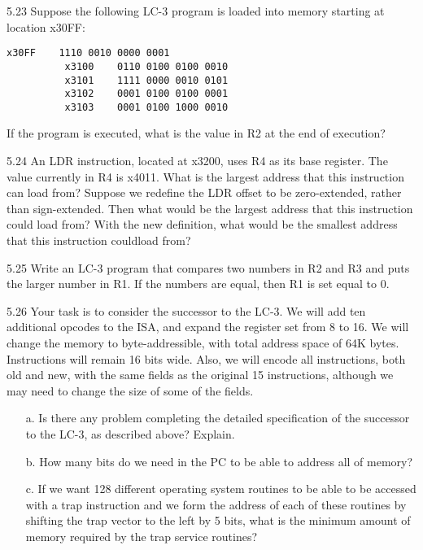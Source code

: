 \documentclass{patt}
\begin{document}
\begin{exercises}
\enlargethispage{-\baselineskip}

\pagebreak

\item[5.23] Suppose the following LC-3 program is loaded into memory
  starting at location x30FF:
\color{seventyblack}
\begin{Verbatim}[fontsize=\fontsize{9}{14}\selectfont]
          x30FF    1110 0010 0000 0001
          x3100    0110 0100 0100 0010
          x3101    1111 0000 0010 0101
          x3102    0001 0100 0100 0001
          x3103    0001 0100 1000 0010
\end{Verbatim}
\normalcolor
If the program is executed, what is the value in R2 at the end of
execution?

\item[5.24] An LDR instruction, located at x3200, uses R4 as its base
  register. The value currently in R4 is x4011. What is the largest
  address that this instruction can load from? Suppose we redefine the
  LDR offset to be zero-extended, rather than sign-extended. Then what
  would be the largest address that this instruction could load from?
  With the new definition, what would be the smallest address that
  this instruction could\break load from?

\item[5.25] Write an LC-3 program that compares two numbers in R2 and
  R3 and puts the larger number in R1. If the numbers are equal, then
  R1 is set equal to 0.

\item[5.26] Your task is to consider the successor to the LC-3. We 
  will add ten additional opcodes to the ISA, and expand the register 
  set from 8 to 16. We will change the memory to byte-addressible, 
  with total address space of 64K bytes. Instructions will remain 16 
  bits wide. Also, we will encode all instructions, both old and new, 
  with the same fields as the original 15 instructions, although we 
  may need to change the size of some of the fields.
\begin{enumerate}[a.]
\item[a.]  Is there any problem completing the detailed specification 
  of the successor to the LC-3, as described above? Explain.

\item[b.]  How many bits do we need in the PC to be able to address 
  all of memory? 

\item[c.]  If we want 128 different operating system routines to be
  able to be accessed with a trap instruction and we form the address
  of each of these routines by shifting the trap vector to the left by
  5 bits, what is the minimum amount of memory required by the trap
  service routines?


\end{enumerate}
\end{exercises}
\end{document}

